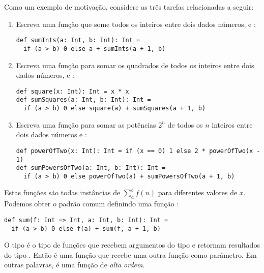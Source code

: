 Como um exemplo de motiva\c{c}\~{a}o, considere as tr\^{e}s tarefas relacionadas a seguir:
\begin{enumerate}
\item
Escreva uma fun\c{c}\~{a}o que some todos os inteiros entre dois dados n\'{u}meros,  e :  
\begin{lstlisting}
def sumInts(a: Int, b: Int): Int =
  if (a > b) 0 else a + sumInts(a + 1, b)
\end{lstlisting}

 \item 
Escreva uma fun\c{c}\~{a}o para somar os quadrados de todos os inteiros entre dois dados n\'{u}meros, 
  e :

\begin{lstlisting}
def square(x: Int): Int = x * x
def sumSquares(a: Int, b: Int): Int =
  if (a > b) 0 else square(a) + sumSquares(a + 1, b)
\end{lstlisting}
\item
Escreva uma fun\c{c}\~{a}o para somar as pot\^{e}ncias $2^n$ de todos os $n$ inteiros entre
dois dados n\'{u}meros  e :  

\begin{lstlisting}
def powerOfTwo(x: Int): Int = if (x == 0) 1 else 2 * powerOfTwo(x - 1)
def sumPowersOfTwo(a: Int, b: Int): Int =
  if (a > b) 0 else powerOfTwo(a) + sumPowersOfTwo(a + 1, b)
\end{lstlisting}
\end{enumerate}

Estas fun\c{c}\~{o}es s\~{a}o todas inst\^{a}ncias de \(\sum^b_a f(n)\) para diferentes valores de $x$.
Podemos obter o padr\~{a}o comum definindo uma fun\c{c}\~{a}o : 
\begin{lstlisting}
def sum(f: Int => Int, a: Int, b: Int): Int =
  if (a > b) 0 else f(a) + sum(f, a + 1, b)
\end{lstlisting}
O tipo  \'{e} o tipo de fun\c{c}\~{o}es que recebem argumentos do tipo
 e retornam resultados do tipo . Ent\~{a}o  \'{e} uma 
fun\c{c}\~{a}o que recebe uma outra fun\c{c}\~{a}o como par\^{a}metro. Em outras palavras, 
\'{e} uma fun\c{c}\~{a}o de {\em alta ordem}.     

